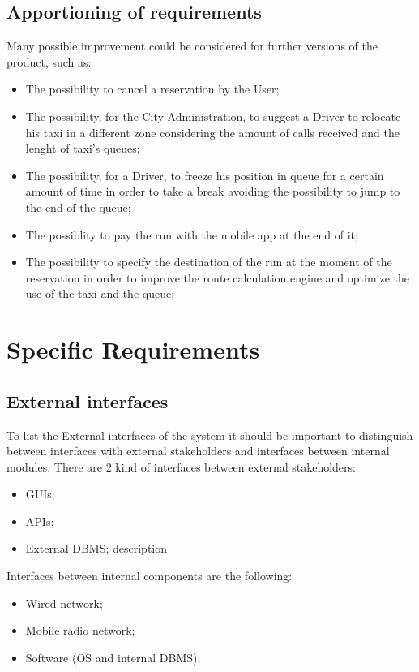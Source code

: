 \documentclass[12pt,a4paper]{book}
\begin{document}
		\section{Apportioning of requirements}
		Many possible improvement could be considered for further versions of the product, such as:
		\begin{itemize}
			\item[\textbullet] The possibility to cancel a reservation by the User;
			\item[\textbullet] The possibility, for the City Administration, to suggest a Driver to relocate his taxi in a different zone considering the amount of calls received and the lenght of taxi's queues;
			\item[\textbullet] The possibility, for a Driver, to freeze his position in queue for a certain amount of time in order to take a break avoiding the possibility to jump to the end of the queue;
			\item[\textbullet] The possiblity to pay the run with the mobile app at the end of it;
			\item[\textbullet] The possibility to specify the destination of the run at the moment of the reservation in order to improve the route calculation engine and optimize the use of the taxi and the queue;
		\end{itemize}
	\chapter{Specific Requirements}
		\section{External interfaces}
		To list the External interfaces of the system it should be important to distinguish between interfaces with external stakeholders and interfaces between internal modules. There are 2 kind of interfaces between external stakeholders:
		\begin{itemize}
			\item[\textbullet] GUIs;
			\item[\textbullet] APIs;
			\item[\textbullet] External DBMS; description
		\end{itemize}
		Interfaces between internal components are the following:
		\begin{itemize}
			\item[\textbullet] Wired network;
			\item[\textbullet] Mobile radio network;
			\item[\textbullet] Software (OS and internal DBMS);
		\end{itemize}
\end{document}
